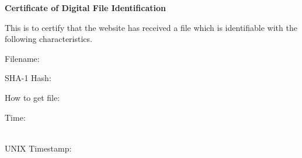 \documentclass[a4paper,11pt]{article}
\begin{document}
\begin{center}
    \Huge\bfseries%
    {Certificate of Digital File Identification}
\end{center}
\bigskip
\bigskip
\sloppy

This is to certify that the website has received a file
which is identifiable with the following characteristics.
\bigskip


Filename:

{\sffamily\Large\bfseries\strut\METADATAbasename}
\bigskip



SHA-1 Hash:

{\sffamily\strut\METADATAhash}
\bigskip



How to get file:

{\sffamily\strut\href{\METADATAurlbyhash}{\METADATAurlbyhash}}
\bigskip
\bigskip



\qrcode[height=32mm]{\METADATAurlbyhash}



\vfill

Time: \strut\METADATAtimeiso\\
UNIX Timestamp: \strut\METADATAtimestamp
\end{document}
